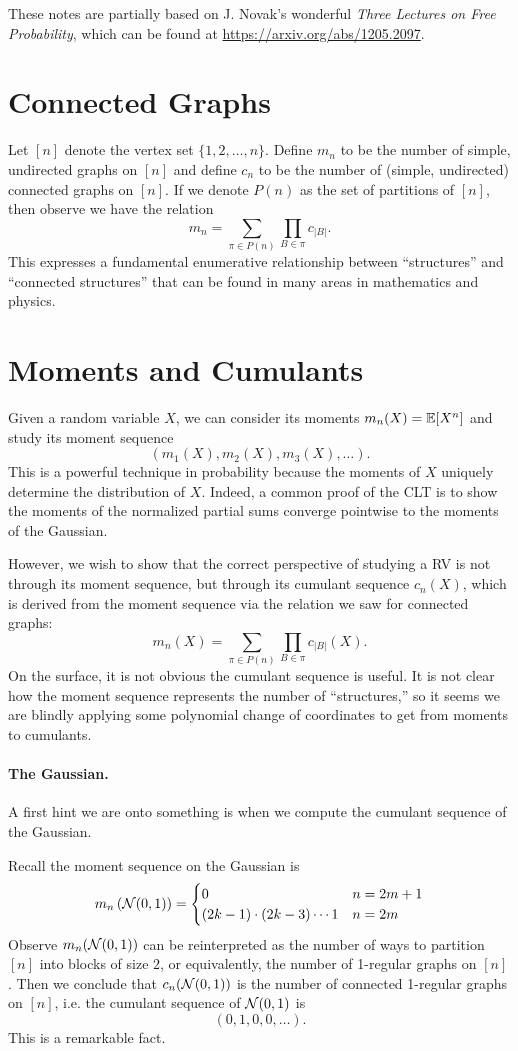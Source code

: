 These notes are partially based on J. Novak's wonderful \textit{Three Lectures on Free Probability}, which can be found at \url{https://arxiv.org/abs/1205.2097}.

\section*{Connected Graphs}
Let $[n]$ denote the vertex set $\{1, 2, \dots, n\}$. Define $m_n$ to be the number of simple, undirected graphs on $[n]$ and define $c_n$ to be the number of (simple, undirected) connected graphs on $[n]$. If we denote $P(n)$ as the set of partitions of $[n]$, then observe we have the relation
\[
    m_n = \sum_{\pi \in P(n)} \prod_{B \in \pi} c_{|B|}.
\]
This expresses a fundamental enumerative relationship between ``structures'' and ``connected structures'' that can be found in many areas in mathematics and physics.

\section*{Moments and Cumulants}
Given a random variable $X$, we can consider its moments $m_n(X) = {\mathbb E}[X^n]$ and study its moment sequence
\[
    (m_1(X), m_2(X), m_3(X), \dots).
\]
This is a powerful technique in probability because the moments of $X$ uniquely determine the distribution of $X$. Indeed, a common proof of the CLT is to show the moments of the normalized partial sums converge pointwise to the moments of the Gaussian.

However, we wish to show that the correct perspective of studying a RV is not through its moment sequence, but through its cumulant sequence $c_n(X)$, which is derived from the moment sequence via the relation we saw for connected graphs:
\[
    m_n(X) = \sum_{\pi \in P(n)} \prod_{B \in \pi} c_{|B|}(X).
\]
On the surface, it is not obvious the cumulant sequence is useful. It is not clear how the moment sequence represents the number of ``structures,'' so it seems we are blindly applying some polynomial change of coordinates to get from moments to cumulants.

\paragraph{The Gaussian.} A first hint we are onto something is when we compute the cumulant sequence of the Gaussian.

Recall the moment sequence on the Gaussian is
\[
    m_n\left({\mathcal N}(0,1)\right) =
    \begin{cases}
        0                            & n = 2m + 1\\
        (2k-1) \cdot (2k-3) \cdots 1 & n = 2m
    \end{cases}
\]
Observe $m_n({\mathcal N}(0,1))$ can be reinterpreted as the number of ways to partition $[n]$ into blocks of size $2$, or equivalently, the number of 1-regular graphs on $[n]$. Then we conclude that $c_n({\mathcal N}(0,1))$ is the number of connected 1-regular graphs on $[n]$, i.e. the cumulant sequence of ${\mathcal N}(0,1)$ is
\[
    (0, 1, 0, 0, \dots).
\]
This is a remarkable fact.

